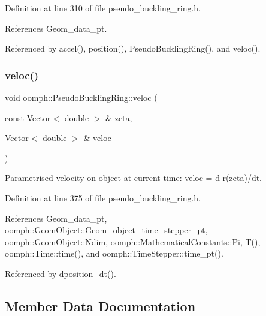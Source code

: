 Definition at line 310 of file pseudo\+\_\+buckling\+\_\+ring.\+h.



References Geom\+\_\+data\+\_\+pt.



Referenced by accel(), position(), Pseudo\+Buckling\+Ring(), and veloc().

\mbox{\label{classoomph_1_1PseudoBucklingRing_a7c45a80564ceaeb146d9eb813611572d}} 
\subsubsection{\texorpdfstring{veloc()}{veloc()}}
{\footnotesize\ttfamily void oomph\+::\+Pseudo\+Buckling\+Ring\+::veloc (\begin{DoxyParamCaption}\item[{const \hyperlink{classoomph_1_1Vector}{Vector}$<$ double $>$ \&}]{zeta,  }\item[{\hyperlink{classoomph_1_1Vector}{Vector}$<$ double $>$ \&}]{veloc }\end{DoxyParamCaption})\hspace{0.3cm}{\ttfamily [inline]}}



Parametrised velocity on object at current time\+: veloc = d r(zeta)/dt. 



Definition at line 375 of file pseudo\+\_\+buckling\+\_\+ring.\+h.



References Geom\+\_\+data\+\_\+pt, oomph\+::\+Geom\+Object\+::\+Geom\+\_\+object\+\_\+time\+\_\+stepper\+\_\+pt, oomph\+::\+Geom\+Object\+::\+Ndim, oomph\+::\+Mathematical\+Constants\+::\+Pi, T(), oomph\+::\+Time\+::time(), and oomph\+::\+Time\+Stepper\+::time\+\_\+pt().



Referenced by dposition\+\_\+dt().



\subsection{Member Data Documentation}
\mbox{\label{classoomph_1_1PseudoBucklingRing_a6d7d859995d19d6dbcd13f444fb73d6a}} 
